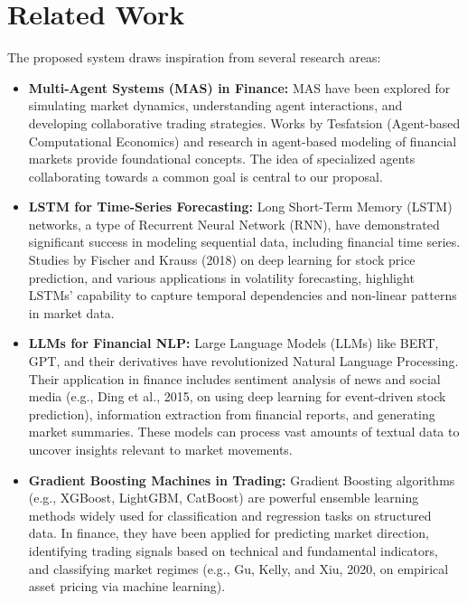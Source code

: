 \documentclass[11pt]{article}
\begin{document}
\section{Related Work}

The proposed system draws inspiration from several research areas:

\begin{itemize}
\item   \textbf{Multi-Agent Systems (MAS) in Finance:} MAS have been explored for simulating market dynamics, understanding agent interactions, and developing collaborative trading strategies. Works by Tesfatsion (Agent-based Computational Economics) and research in agent-based modeling of financial markets provide foundational concepts. The idea of specialized agents collaborating towards a common goal is central to our proposal.

\item   \textbf{LSTM for Time-Series Forecasting:} Long Short-Term Memory (LSTM) networks, a type of Recurrent Neural Network (RNN), have demonstrated significant success in modeling sequential data, including financial time series. Studies by Fischer and Krauss (2018) on deep learning for stock price prediction, and various applications in volatility forecasting, highlight LSTMs' capability to capture temporal dependencies and non-linear patterns in market data.

\item   \textbf{LLMs for Financial NLP:} Large Language Models (LLMs) like BERT, GPT, and their derivatives have revolutionized Natural Language Processing. Their application in finance includes sentiment analysis of news and social media (e.g., Ding et al., 2015, on using deep learning for event-driven stock prediction), information extraction from financial reports, and generating market summaries. These models can process vast amounts of textual data to uncover insights relevant to market movements.

\item   \textbf{Gradient Boosting Machines in Trading:} Gradient Boosting algorithms (e.g., XGBoost, LightGBM, CatBoost) are powerful ensemble learning methods widely used for classification and regression tasks on structured data. In finance, they have been applied for predicting market direction, identifying trading signals based on technical and fundamental indicators, and classifying market regimes (e.g., Gu, Kelly, and Xiu, 2020, on empirical asset pricing via machine learning).


\end{itemize}
\end{document}
